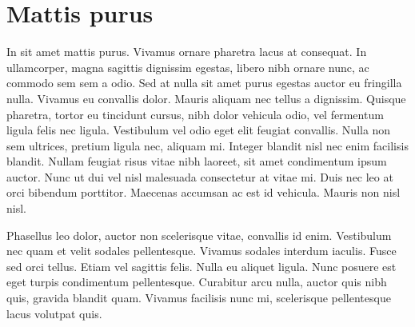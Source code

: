 \chapter{Mattis purus}

In sit amet mattis purus. Vivamus ornare pharetra lacus at consequat. In ullamcorper, magna sagittis dignissim egestas, libero nibh ornare nunc, ac commodo sem sem a odio. Sed at nulla sit amet purus egestas auctor eu fringilla nulla. Vivamus eu convallis dolor. Mauris aliquam nec tellus a dignissim. Quisque pharetra, tortor eu tincidunt cursus, nibh dolor vehicula odio, vel fermentum ligula felis nec ligula. Vestibulum vel odio eget elit feugiat convallis. Nulla non sem ultrices, pretium ligula nec, aliquam mi. Integer blandit nisl nec enim facilisis blandit. Nullam feugiat risus vitae nibh laoreet, sit amet condimentum ipsum auctor. Nunc ut dui vel nisl malesuada consectetur at vitae mi. Duis nec leo at orci bibendum porttitor. Maecenas accumsan ac est id vehicula. Mauris non nisl nisl.

Phasellus leo dolor, auctor non scelerisque vitae, convallis id enim. Vestibulum nec quam et velit sodales pellentesque. Vivamus sodales interdum iaculis. Fusce sed orci tellus. Etiam vel sagittis felis. Nulla eu aliquet ligula. Nunc posuere est eget turpis condimentum pellentesque. Curabitur arcu nulla, auctor quis nibh quis, gravida blandit quam. Vivamus facilisis nunc mi, scelerisque pellentesque lacus volutpat quis.
